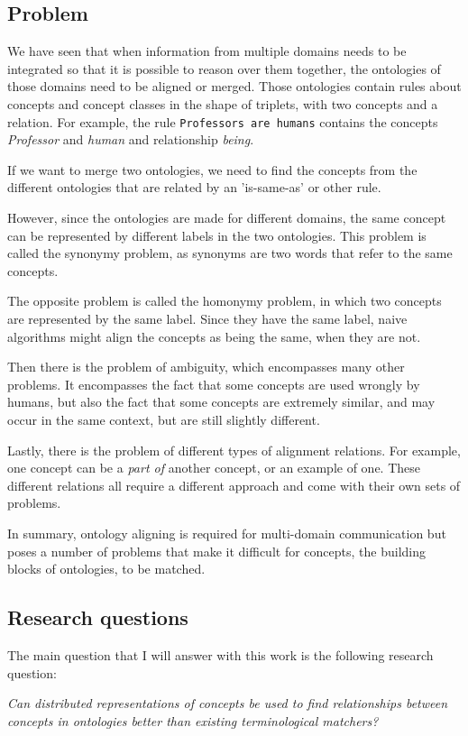 \documentclass{article}
\begin{document}
 \subsection{Problem}
 We have seen that when information from multiple domains needs to be integrated so that it is possible to reason over them together, the ontologies of those domains need to be aligned or merged. %
  Those ontologies contain rules about concepts and concept classes in the shape of triplets, with two concepts and a relation. For example, the rule {\tt Professors are humans} contains the concepts \emph{Professor} and \emph{human} and relationship \emph{being}.
 
 If we want to merge two ontologies, we need to find the concepts from the different ontologies that are related by an 'is-same-as' or other rule.
 
 However, since the ontologies are made for different domains, the same concept can be represented by different labels in the two ontologies. This problem is called the synonymy problem, as synonyms are two words that refer to the same concepts.
 
 The opposite problem is called the homonymy problem, in which two concepts are represented by the same label. Since they have the same label, naive algorithms might align the concepts as being the same, when they are not.
 
 Then there is the problem of ambiguity, which encompasses many other problems. It encompasses the fact that some concepts are used wrongly by humans, but also the fact that some concepts are extremely similar, and may occur in the same context, but are still slightly different.
 
 Lastly, there is the problem of different types of alignment relations. For example, one concept can be a \emph{part of} another concept, or an example of one. These different relations all require a different approach and come with their own sets of problems.
 
 In summary, ontology aligning is required for multi-domain communication but poses a number of problems that make it difficult for concepts, the building blocks of ontologies, to be matched.
 \subsection{Research questions}
 The main question that I will answer with this work is the following research question:
 
 \begin{center}
 \textit{
 Can distributed representations of concepts be used to find relationships between concepts in ontologies better than existing terminological matchers?
 }
 \end{center}
 
\end{document}
